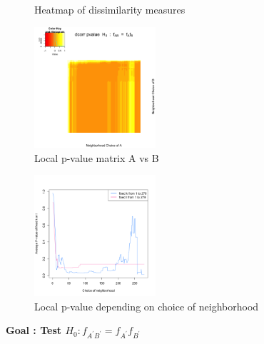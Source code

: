 \documentclass[12pt]{report}
\begin{document}
\begin{figure}[H]
\caption{Heatmap of dissimilarity measures}
\label{fig:subnetwork}    
\end{figure}


\begin{figure}[H]
\captionsetup{format=plain}
\centering
\includegraphics[width=0.4\textwidth]{../figure/P_A_B.png}
\caption{Local p-value matrix A vs B}
\label{fig:PAB}
\end{figure}


\begin{figure}[H]
\captionsetup{format=plain}
\centering
\includegraphics[width=0.4\textwidth]{../figure/AB_hist.png}
\caption{Local p-value depending on choice of neighborhood}
\label{fig:ABhist}
\end{figure}


\newpage
\begin{center}\textbf{Goal : Test $H_{0} : f_{A^\prime B^\prime} = f_{A^\prime}f_{B^\prime}$}
\end{center} 
\end{document}
